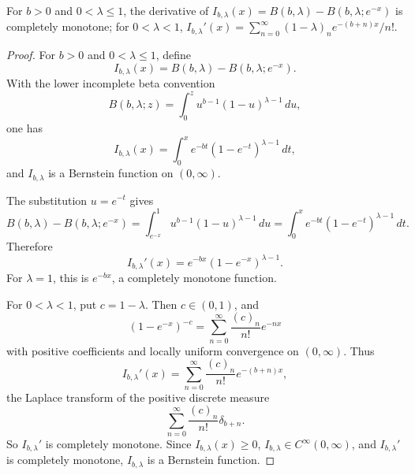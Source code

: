 \begin{proposition}
\label{res:incomplete-beta-tail-derivative-cm-certificate}
For \(b>0\) and \(0<\lambda\le1\), the derivative of \(I_{b,\lambda}(x)=B(b,\lambda)-B(b,\lambda;e^{-x})\) is completely monotone; for \(0<\lambda<1\), \(I_{b,\lambda}'(x)=\sum_{n=0}^\infty (1-\lambda)_n e^{-(b+n)x}/n!\).
\end{proposition}
\begin{proof}
For \(b>0\) and \(0<\lambda\le1\), define
\[
I_{b,\lambda}(x)=B(b,\lambda)-B(b,\lambda;e^{-x}).
\]
With the lower incomplete beta convention
\[
B(b,\lambda;z)=\int_0^z u^{b-1}(1-u)^{\lambda-1}\,du,
\]
one has
\[
I_{b,\lambda}(x)=\int_0^x e^{-bt}(1-e^{-t})^{\lambda-1}\,dt,
\]
and \(I_{b,\lambda}\) is a Bernstein function on \((0,\infty)\).

The substitution \(u=e^{-t}\) gives
\[
B(b,\lambda)-B(b,\lambda;e^{-x})
=\int_{e^{-x}}^1u^{b-1}(1-u)^{\lambda-1}\,du
=\int_0^x e^{-bt}(1-e^{-t})^{\lambda-1}\,dt.
\]
Therefore
\[
I_{b,\lambda}'(x)=e^{-bx}(1-e^{-x})^{\lambda-1}.
\]
For \(\lambda=1\), this is \(e^{-bx}\), a completely monotone function.

For \(0<\lambda<1\), put \(c=1-\lambda\). Then \(c\in(0,1)\), and
\[
(1-e^{-x})^{-c}
=\sum_{n=0}^\infty \frac{(c)_n}{n!}e^{-nx}
\]
with positive coefficients and locally uniform convergence on \((0,\infty)\). Thus
\[
I_{b,\lambda}'(x)
=\sum_{n=0}^\infty \frac{(c)_n}{n!}e^{-(b+n)x},
\]
the Laplace transform of the positive discrete measure
\[
\sum_{n=0}^\infty \frac{(c)_n}{n!}\delta_{b+n}.
\]
So \(I_{b,\lambda}'\) is completely monotone. Since \(I_{b,\lambda}(x)\ge0\), \(I_{b,\lambda}\in C^\infty(0,\infty)\), and \(I_{b,\lambda}'\) is completely monotone, \(I_{b,\lambda}\) is a Bernstein function.
\end{proof}

